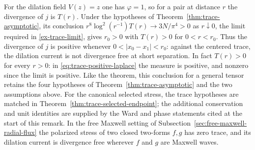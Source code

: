 \begin{remark}
For the dilation field $V(z)=z$ one has $\varphi=1$, so for a pair at
distance $r$ the divergence of $j$ is $T(r)$. Under the hypotheses of
Theorem~\ref{thm:trace-asymptotic}, its conclusion
$r^8\log^2(r^{-1})T(r)\to3N/\pi^4>0$ as $r\downarrow0$, the limit required in
\eqref{ex-trace-limit}, gives $r_0>0$ with $T(r)>0$ for $0<r<r_0$.
Thus the divergence of $j$ is positive whenever
$0<|x_0-x_1|<r_0$: against the centered trace, the dilation current is
not divergence free at short separation. In fact $T(r)>0$ for every
$r>0$: in \eqref{eq:trace-positive-laplace} the measure is positive, and
nonzero since the limit is positive. Like the theorem, this
conclusion for a general tensor retains the four hypotheses of
Theorem~\ref{thm:trace-asymptotic} and the two assumptions above.
For the canonical selected stress, the trace hypotheses are matched
in Theorem~\ref{thm:trace-selected-endpoint}; the additional
conservation and unit identities are supplied by the Ward and phase
statements cited at the start of this remark. In the free Maxwell setting of
Subsection~\ref{sec:free-maxwell-radial-flux} the polarized stress of two
closed two-forms $f,g$ has zero trace, and its dilation current is
divergence free wherever $f$ and $g$ are Maxwell waves.
\end{remark}
